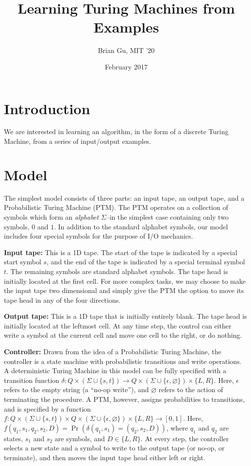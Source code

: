 \documentclass{article}
\title{Learning Turing Machines from Examples}
\author{Brian Gu, MIT '20}
\date{February 2017}
\begin{document}
\maketitle

\section{Introduction}
We are interested in learning an algorithm, in the form of a discrete Turing Machine, from a series of input/output examples.

\section{Model}
The simplest model consists of three parts: an input tape, an output tape, and a Probabilistic Turing Machine (PTM). The PTM operates on a collection of symbols which form an \textit{alphabet} $\Sigma$--in the simplest case containing only two symbols, $0$ and $1$. In addition to the standard alphabet symbols, our model includes four special symbols for the purpose of I/O mechanics. 

\textbf{Input tape:} This is a 1D tape. The start of the tape is indicated by a special start symbol $s$, and the end of the tape is indicated by a special terminal symbol $t$. The remaining symbols are standard alphabet symbols. The tape head is initially located at the first cell. For more complex tasks, we may choose to make the input tape two dimensional and simply give the PTM the option to move its tape head in any of the four directions.

\textbf{Output tape:} This is a 1D tape that is initially entirely blank. The tape head is initially located at the leftmost cell. At any time step, the control can either write a symbol at the current cell and move one cell to the right, or do nothing. 

\textbf{Controller:} Drawn from the idea of a Probabilistic Turing Machine, the controller is a state machine with probabilistic transitions and write operations. A deterministic Turing Machine in this model can be fully specified with a transition function $\delta: Q \times (\Sigma \cup \{s,t\}) \rightarrow Q \times (\Sigma \cup \{\epsilon, \varnothing\}) \times \{L, R\}$. Here, $\epsilon$ refers to the empty string (a ``no-op write''), and $\varnothing$ refers to the action of terminating the procedure. A PTM, however, assigns probabilities to transitions, and is specified by a function $f: Q \times (\Sigma \cup \{s,t\}) \times Q \times (\Sigma \cup \{\epsilon, \varnothing\}) \times \{L, R\} \rightarrow [0,1]$. Here, $f(q_1, s_1, q_2, s_2, D) = \Pr(\delta(q_1, s_1) = (q_2, s_2, D))$, where $q_1$ and $q_2$ are states, $s_1$ and $s_2$ are symbols, and $D \in \{L, R\}$. At every step, the controller selects a new state and a symbol to write to the output tape (or no-op, or terminate), and then moves the input tape head either left or right.
\end{document}
